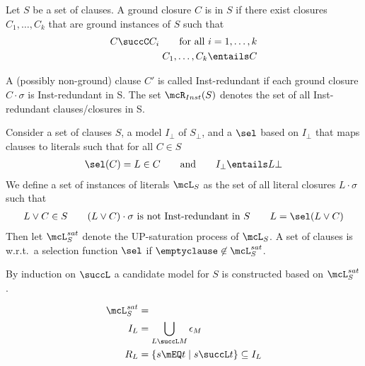 \begin{definition}
    Let $S$ be a set of clauses.
    A ground closure $C$ is  in $S$
    if there exist closures $C_1,\ldots,C_k$
    that are ground instances of $S$ such that
    \begin{align*}
        C \succC C_i \tag*{for all $i=1,\ldots,k$} \\
        C_1,\ldots,C_k\entails C
    \end{align*}

    A (possibly non-ground) clause $C'$ is called Inst-redundant
    if each ground closure $C\cdot\sigma$ is Inst-redundant in S.
    The set $\mcR_{Inst}(S)$ denotes the set of all Inst-redundant clauses/closures in S.
\end{definition}

\begin{definition}
    Consider a set of clauses $S$, a model $I_\bot$ of $S_\bot$,
    and a  $\sel$ based on $I_\bot$
    that maps clauses to literals such that for all $C\in S$
    \begin{gather*}
        \sel(C)=L \in C
        \qquad
        \text{and}
        \qquad
        I_\bot \entails L\bot
    \end{gather*}
    We define a set of  instances of literals $\mcL_S$
    as the set of all literal closures $L\cdot\sigma$ such that
    \begin{gather*}
        L\lor C\in S
        \qquad
        (L\lor C)\cdot\sigma\text{ is not Inst-redundant in }S
        \qquad
        L = \sel(L\lor C)
    \end{gather*}
    Then let $\mcL_S^{sat}$ denote the UP-saturation process of $\mcL_S$.
    A set of clauses is  w.r.t.~a selection function $\sel$
    if $\emptyclause\not\in\mcL_S^{sat}$.
\end{definition}

\begin{definition}
    By induction on $\succL$
    a candidate model for $S$ is constructed
    based on $\mcL_S^{sat}$.

    \begin{align*}
        \mcL_S^{sat} &=
        \\
        I_L &= \bigcup_{L \succL M}
            \epsilon_M
        \\
        R_L &=  \{
            s\mEQ t \mid s\succL t
        \} \subseteq I_L
    \end{align*}

\end{definition}

